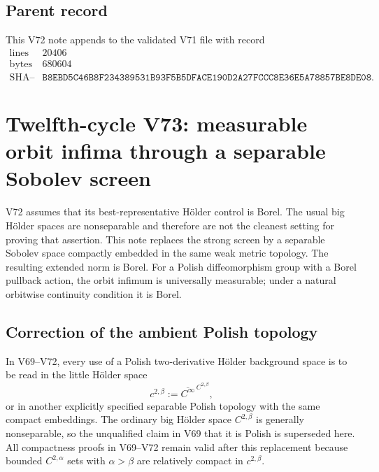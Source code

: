 \documentclass[11pt]{article}
\theoremstyle{remark}
\begin{document}
\subsection{Parent record}

This V72 note appends to the validated V71 file with record
\[
\begin{array}{c|c}
\text{lines}&20406\\
\text{bytes}&680604\\
\text{SHA--256}&
\texttt{B8EBD5C46B8F234389531B93F5B5DFACE190D2A27FCCC8E36E5A78857BE8DE08}.
\end{array}
\]



\section{Twelfth-cycle V73: measurable orbit infima through a
separable Sobolev screen}
\label{sec:v12v73}

V72 assumes that its best-representative Hölder control is Borel.
The usual big Hölder spaces are nonseparable and therefore are not the cleanest setting
for proving that assertion.  This note replaces the strong screen by
a separable Sobolev space compactly embedded in the same weak metric
topology.  The resulting extended norm is Borel.  For a Polish
diffeomorphism group with a Borel pullback action, the orbit infimum
is universally measurable; under a natural orbitwise continuity
condition it is Borel.

\subsection{Correction of the ambient Polish topology}

In V69--V72, every use of a Polish two-derivative Hölder background
space is to be read in the little Hölder space
\[
 c^{2,\beta}
 :=\overline{C^\infty}^{\,C^{2,\beta}},
                                                               \tag{73.1}
\]
or in another explicitly specified separable Polish topology with
the same compact embeddings.  The ordinary big Hölder space
\(C^{2,\beta}\) is generally nonseparable, so the unqualified claim
in V69 that it is Polish is superseded here.  All compactness proofs
in V69--V72 remain valid after this replacement because bounded
\(C^{2,\alpha}\) sets with \(\alpha>\beta\) are relatively compact
in \(c^{2,\beta}\).
\end{document}
